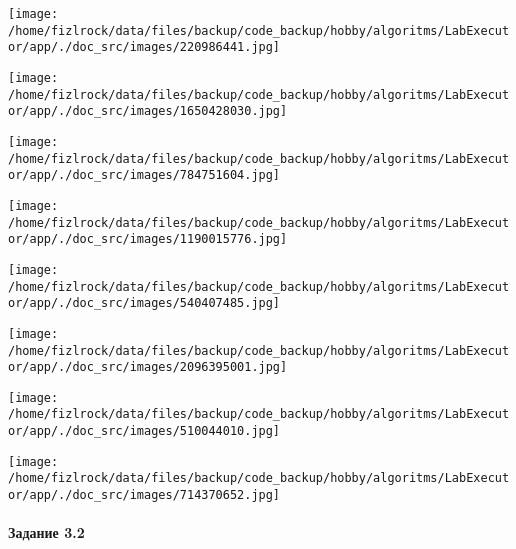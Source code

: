 \documentclass[a4paper, 12pt]{article}
\begin{document}
\texttt{[image: /home/fizlrock/data/files/backup/code\_backup/hobby/algoritms/LabExecutor/app/./doc\_src/images/220986441.jpg]}

\texttt{[image: /home/fizlrock/data/files/backup/code\_backup/hobby/algoritms/LabExecutor/app/./doc\_src/images/1650428030.jpg]}

\texttt{[image: /home/fizlrock/data/files/backup/code\_backup/hobby/algoritms/LabExecutor/app/./doc\_src/images/784751604.jpg]}

\texttt{[image: /home/fizlrock/data/files/backup/code\_backup/hobby/algoritms/LabExecutor/app/./doc\_src/images/1190015776.jpg]}

\texttt{[image: /home/fizlrock/data/files/backup/code\_backup/hobby/algoritms/LabExecutor/app/./doc\_src/images/540407485.jpg]}

\texttt{[image: /home/fizlrock/data/files/backup/code\_backup/hobby/algoritms/LabExecutor/app/./doc\_src/images/2096395001.jpg]}

\texttt{[image: /home/fizlrock/data/files/backup/code\_backup/hobby/algoritms/LabExecutor/app/./doc\_src/images/510044010.jpg]}

\texttt{[image: /home/fizlrock/data/files/backup/code\_backup/hobby/algoritms/LabExecutor/app/./doc\_src/images/714370652.jpg]}
\pagebreak

\paragraph{Задание 3.2}
\end{document}
